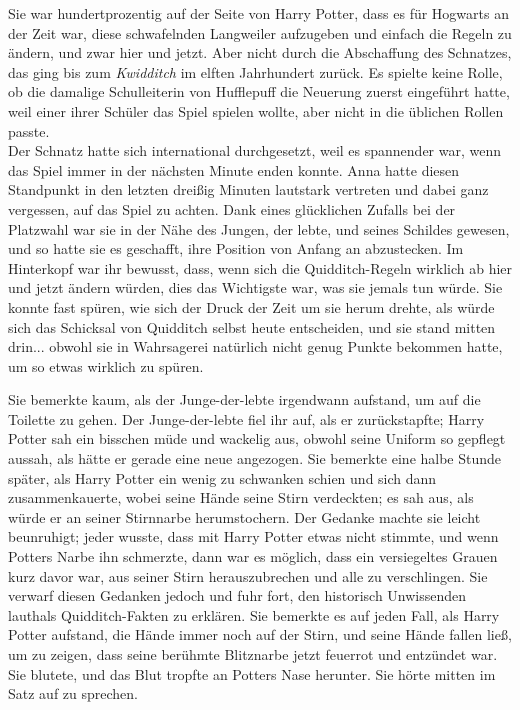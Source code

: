 {Sie war hundertprozentig auf der Seite von Harry Potter, dass es für Hogwarts an der Zeit war, diese schwafelnden Langweiler aufzugeben und einfach die Regeln zu ändern, und zwar hier und jetzt. Aber nicht durch die Abschaffung des Schnatzes, das ging bis zum \emph{Kwidditch} im elften Jahrhundert zurück. Es spielte keine Rolle, ob die damalige Schulleiterin von Hufflepuff die Neuerung zuerst eingeführt hatte, weil einer ihrer Schüler das Spiel spielen wollte, aber nicht in die üblichen Rollen passte.\\ Der Schnatz hatte sich international durchgesetzt, weil es spannender war, wenn das Spiel immer in der nächsten Minute enden konnte. Anna hatte diesen Standpunkt in den letzten dreißig Minuten lautstark vertreten und dabei ganz vergessen, auf das Spiel zu achten. Dank eines glücklichen Zufalls bei der Platzwahl war sie in der Nähe des Jungen, der lebte, und seines Schildes gewesen, und so hatte sie es geschafft, ihre Position von Anfang an abzustecken. Im Hinterkopf war ihr bewusst, dass, wenn sich die Quidditch-Regeln wirklich ab hier und jetzt ändern würden, dies das Wichtigste war, was sie jemals tun würde. Sie konnte fast spüren, wie sich der Druck der Zeit um sie herum drehte, als würde sich das Schicksal von Quidditch selbst heute entscheiden, und sie stand mitten drin... obwohl sie in Wahrsagerei natürlich nicht genug Punkte bekommen hatte, um so etwas wirklich zu spüren.

Sie bemerkte kaum, als der Junge-der-lebte irgendwann aufstand, um auf die Toilette zu gehen. Der Junge-der-lebte fiel ihr auf, als er zurückstapfte; Harry Potter sah ein bisschen müde und wackelig aus, obwohl seine Uniform so gepflegt aussah, als hätte er gerade eine neue angezogen. Sie bemerkte eine halbe Stunde später, als Harry Potter ein wenig zu schwanken schien und sich dann zusammenkauerte, wobei seine Hände seine Stirn verdeckten; es sah aus, als würde er an seiner Stirnnarbe herumstochern. Der Gedanke machte sie leicht beunruhigt; jeder wusste, dass mit Harry Potter etwas nicht stimmte, und wenn Potters Narbe ihn schmerzte, dann war es möglich, dass ein versiegeltes Grauen kurz davor war, aus seiner Stirn herauszubrechen und alle zu verschlingen. Sie verwarf diesen Gedanken jedoch und fuhr fort, den historisch Unwissenden lauthals Quidditch-Fakten zu erklären. Sie bemerkte es auf jeden Fall, als Harry Potter aufstand, die Hände immer noch auf der Stirn, und seine Hände fallen ließ, um zu zeigen, dass seine berühmte Blitznarbe jetzt feuerrot und entzündet war. Sie blutete, und das Blut tropfte an Potters Nase herunter. Sie hörte mitten im Satz auf zu sprechen.

}
